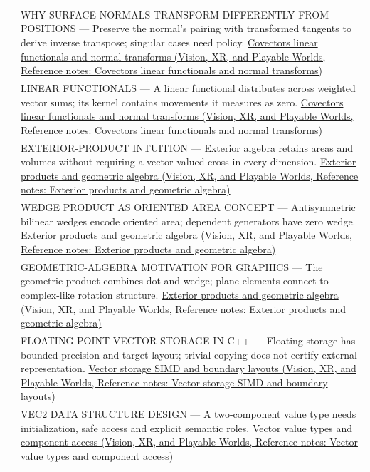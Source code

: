 {\begin{longtable}[]{@{}
  >{\raggedright\arraybackslash}p{}
  >{\raggedright\arraybackslash}p{}@{}}
582 & WHY SURFACE NORMALS TRANSFORM DIFFERENTLY FROM POSITIONS --- Preserve the normal's pairing with transformed tangents to derive inverse transpose; singular cases need policy. \href{../07-Vision-XR-and-Playable-Worlds/main.pdf\#nameddest=appendix-46da295c6787}{Covectors linear functionals and normal transforms (Vision, XR, and Playable Worlds, Reference notes: Covectors linear functionals and normal transforms)} \\
583 & LINEAR FUNCTIONALS --- A linear functional distributes across weighted vector sums; its kernel contains movements it measures as zero. \href{../07-Vision-XR-and-Playable-Worlds/main.pdf\#nameddest=appendix-46da295c6787}{Covectors linear functionals and normal transforms (Vision, XR, and Playable Worlds, Reference notes: Covectors linear functionals and normal transforms)} \\
584 & EXTERIOR-PRODUCT INTUITION --- Exterior algebra retains areas and volumes without requiring a vector-valued cross in every dimension. \href{../07-Vision-XR-and-Playable-Worlds/main.pdf\#nameddest=appendix-e1960925d1b8}{Exterior products and geometric algebra (Vision, XR, and Playable Worlds, Reference notes: Exterior products and geometric algebra)} \\
585 & WEDGE PRODUCT AS ORIENTED AREA CONCEPT --- Antisymmetric bilinear wedges encode oriented area; dependent generators have zero wedge. \href{../07-Vision-XR-and-Playable-Worlds/main.pdf\#nameddest=appendix-e1960925d1b8}{Exterior products and geometric algebra (Vision, XR, and Playable Worlds, Reference notes: Exterior products and geometric algebra)} \\
586 & GEOMETRIC-ALGEBRA MOTIVATION FOR GRAPHICS --- The geometric product combines dot and wedge; plane elements connect to complex-like rotation structure. \href{../07-Vision-XR-and-Playable-Worlds/main.pdf\#nameddest=appendix-e1960925d1b8}{Exterior products and geometric algebra (Vision, XR, and Playable Worlds, Reference notes: Exterior products and geometric algebra)} \\
587 & FLOATING-POINT VECTOR STORAGE IN C++ --- Floating storage has bounded precision and target layout; trivial copying does not certify external representation. \href{../07-Vision-XR-and-Playable-Worlds/main.pdf\#nameddest=appendix-26bf6bf2fb8b}{Vector storage SIMD and boundary layouts (Vision, XR, and Playable Worlds, Reference notes: Vector storage SIMD and boundary layouts)} \\
588 & VEC2 DATA STRUCTURE DESIGN --- A two-component value type needs initialization, safe access and explicit semantic roles. \href{../07-Vision-XR-and-Playable-Worlds/main.pdf\#nameddest=appendix-37a39984ba66}{Vector value types and component access (Vision, XR, and Playable Worlds, Reference notes: Vector value types and component access)} \\

\end{longtable}}

